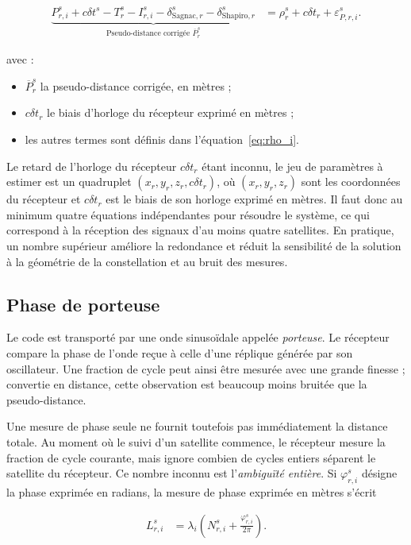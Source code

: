 \begin{align}
\underbrace{
P_{r,i}^s
+c\delta t^s
-T_r^s
-I_{r,i}^s
-\delta_{\mathrm{Sagnac},r}^s
-\delta_{\mathrm{Shapiro},r}^s
}_{\text{Pseudo-distance corrigée }\overline P_r^s}
&=
\rho_r^s+c\delta t_r+\varepsilon_{P,r,i}^s.
\label{eq:termes_eval}
\end{align}

avec :

\begin{itemize}
    \item $\overline P_r^s$ la pseudo-distance corrigée, en mètres ;
    \item $c\delta t_r$ le biais d'horloge du récepteur exprimé en mètres ;
    \item les autres termes sont définis dans l'équation~\eqref{eq:rho_i}.
\end{itemize}

Le retard de l'horloge du récepteur $c\delta t_r$ étant inconnu, le jeu de
paramètres à estimer est un quadruplet
$(x_r,y_r,z_r,c\delta t_r)$, où $(x_r,y_r,z_r)$ sont les coordonnées du
récepteur et $c\delta t_r$ est le biais de son horloge exprimé en mètres. Il
faut donc au minimum quatre équations indépendantes pour résoudre le système,
ce qui correspond à la réception des signaux d'au moins quatre satellites. En
pratique, un nombre supérieur améliore la redondance et réduit la sensibilité
de la solution à la géométrie de la constellation et au bruit des mesures.

\subsection{Phase de porteuse}

Le code est transporté par une onde sinusoïdale appelée \emph{porteuse}. Le
récepteur compare la phase de l'onde reçue à celle d'une réplique générée par
son oscillateur. Une fraction de cycle peut ainsi être mesurée avec une grande
finesse ; convertie en distance, cette observation est beaucoup moins bruitée
que la pseudo-distance.

Une mesure de phase seule ne fournit toutefois pas immédiatement la distance
totale. Au moment où le suivi d'un satellite commence, le récepteur mesure la
fraction de cycle courante, mais ignore combien de cycles entiers séparent le
satellite du récepteur. Ce nombre inconnu est l'\emph{ambiguïté entière}. Si
$\varphi_{r,i}^s$ désigne la phase exprimée en radians, la mesure
de phase exprimée en mètres s'écrit

\begin{align}
L_{r,i}^s
&=
\lambda_i
\left(
N_{r,i}^s+\frac{\varphi_{r,i}^s}{2\pi}
\right).
\label{eq:carrier_phase_definition}
\end{align}

